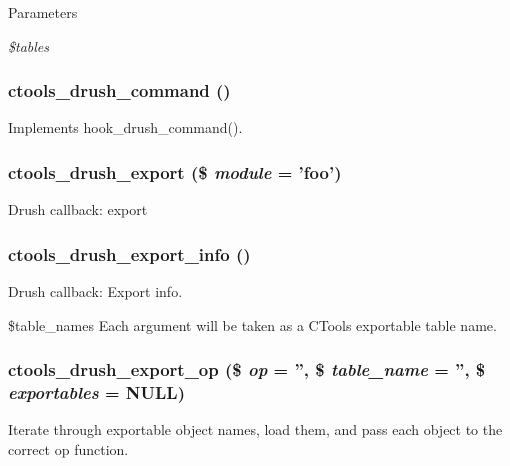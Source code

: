 \begin{DoxyParams}{Parameters}
\item[{\em \$tables}]\end{DoxyParams}
\hypertarget{ctools_8drush_8inc_afd3a39513891dc7bcc3870d2acaa1b6a}{
\subsubsection[{ctools\_\-drush\_\-command}]{\setlength{\rightskip}{0pt plus 5cm}ctools\_\-drush\_\-command ()}}
\label{ctools_8drush_8inc_afd3a39513891dc7bcc3870d2acaa1b6a}
Implements hook\_\-drush\_\-command(). \hypertarget{ctools_8drush_8inc_a6a3eb8522b6855b79a3d09a362cbb2b1}{
\subsubsection[{ctools\_\-drush\_\-export}]{\setlength{\rightskip}{0pt plus 5cm}ctools\_\-drush\_\-export (\$ {\em module} = {\ttfamily 'foo'})}}
\label{ctools_8drush_8inc_a6a3eb8522b6855b79a3d09a362cbb2b1}
Drush callback: export \hypertarget{ctools_8drush_8inc_adb91b1445c9116664fbe5f29e815e119}{
\subsubsection[{ctools\_\-drush\_\-export\_\-info}]{\setlength{\rightskip}{0pt plus 5cm}ctools\_\-drush\_\-export\_\-info ()}}
\label{ctools_8drush_8inc_adb91b1445c9116664fbe5f29e815e119}
Drush callback: Export info.

\$table\_\-names Each argument will be taken as a CTools exportable table name. \hypertarget{ctools_8drush_8inc_aaa52db837a2d9485e2197941caa74f06}{
\subsubsection[{ctools\_\-drush\_\-export\_\-op}]{\setlength{\rightskip}{0pt plus 5cm}ctools\_\-drush\_\-export\_\-op (\$ {\em op} = {\ttfamily ''}, \/  \$ {\em table\_\-name} = {\ttfamily ''}, \/  \$ {\em exportables} = {\ttfamily NULL})}}
\label{ctools_8drush_8inc_aaa52db837a2d9485e2197941caa74f06}
Iterate through exportable object names, load them, and pass each object to the correct op function.



